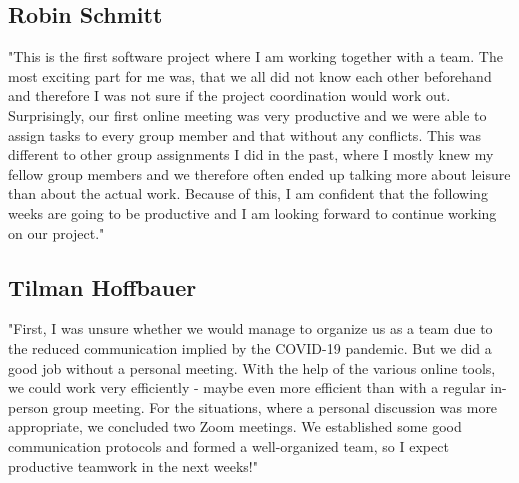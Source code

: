 \documentclass{article}
\begin{document}
\subsection{Robin Schmitt}
"This is the first software project where I am working together with a team. The most exciting part for me was, that we all did not know each other beforehand and therefore I was not sure if the project coordination would work out. Surprisingly, our first online meeting was very productive and we were able to assign tasks to every group member and that without any conflicts. This was different to other group assignments I did in the past, where I mostly knew my fellow group members and we therefore often ended up talking more about leisure than about the actual work. Because of this, I am confident that the following weeks are going to be productive and I am looking forward to continue working on our project."

\subsection{Tilman Hoffbauer}
"First, I was unsure whether we would manage to organize us as a team due to the reduced communication implied by the COVID-19 pandemic.
But we did a good job without a personal meeting.
With the help of the various online tools, we could work very efficiently - maybe even more efficient than with a regular in-person group meeting.
For the situations, where a personal discussion was more appropriate, we concluded two Zoom meetings.
We established some good communication protocols and formed a well-organized team, so I expect productive teamwork in the next weeks!"




\end{document}
